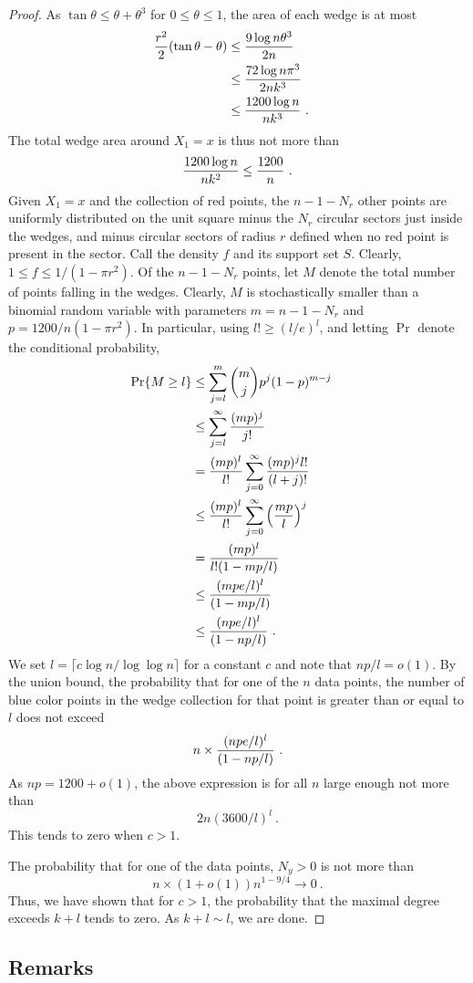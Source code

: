 \documentclass[lotsofwhite,charterfonts]{patmorin}
\newcommand{\PROB}{\Pr}
\begin{document}
\begin{proof}
As $\tan \theta \le \theta + \theta^3$ for $0 \le \theta \le 1$,
the area of each wedge is at most
\[
\begin{aligned}
{ r^2 \over 2} (\tan \theta - \theta)
&\le { 9 \log n \theta^3 \over 2n}  \cr
&\le { 72 \log n \pi^3 \over 2nk^3}  \cr
&\le { 1200 \log n \over n k^3} ~. \cr
\end{aligned}
\]
The total wedge area around $X_1 = x$ is thus not more
than
\[
{ 1200 \log n \over n k^2 } \le { 1200 \over n }~.
\]
Given $X_1 = x$ and the collection of red points,
the $n-1-N_r$ other points are uniformly distributed
on the unit square minus the $N_r$ circular
sectors just inside the wedges, and minus 
circular sectors of radius $r$ defined when no
red point is present in the sector. Call the density $f$
and its support set $S$. Clearly, 
$1 \le f 
\le 1/(1-\pi r^2)$.
Of the $n-1-N_r$ points, let $M$ denote the total
number of points falling in the wedges.
Clearly, $M$ is stochastically smaller
than a binomial random variable with parameters
$m = n-1-N_r$ and $p = 1200/n(1-\pi r^2)$.
In particular, using $l! \ge (l/e)^l$,
and letting $\PROB$ denote the conditional probability,
\[
\begin{aligned}
\PROB \{ M \ge l \}
&\le \sum_{j=l}^m {m \choose j} p^j (1-p)^{m-j} \cr
&\le \sum_{j=l}^\infty {(mp)^j \over j!}  \cr
&=   {(mp)^l \over l!} \sum_{j=0}^\infty {(mp)^j l! \over (l+j)!}  \cr
&\le {(mp)^l \over l!} \sum_{j=0}^\infty \left( {mp \over l} \right)^j  \cr
&=   {(mp)^l \over l! (1-mp/l)}  \cr
&\le   {(mpe/l)^l \over (1-mp/l)}  \cr
&\le   {(npe/l)^l \over (1-np/l)} ~. \cr
\end{aligned}
\]
We set $l = \lceil c \log n / \log \log n \rceil$ for a constant $c$
and note that $np/l = o(1)$.
By the union bound, 
the probability that for one of the $n$ data points,
the number of blue color points in the wedge collection
for that point is greater than or equal to $l$ does not
exceed 
\[
n \times {(npe/l)^l \over (1-np/l)} ~. 
\]
As $np = 1200+o(1)$, the above expression is for all $n$
large enough not more than
\[
2n (3600/l)^l~.
\]
This tends to zero when $c > 1$.

The probability that for one of the data points,
$N_y > 0$ is not more than
\[
n \times (1+o(1)) n^{1-9/4} \to 0~.
\]
Thus, we have shown that for $c > 1$, 
the probability that the maximal degree
exceeds $k+l$ tends to zero. As $k+l \sim l$, we are done.
\end{proof}

\subsection{Remarks}
\end{document}
